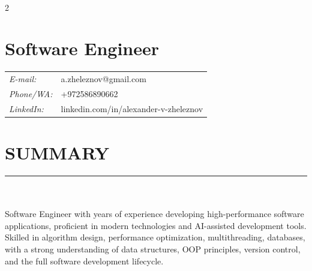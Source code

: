 \documentclass[a4paper,oneside,12pt]{article}
\providecommand{\jobposition}{Software Engineer}
\newcommand{\cvpart}[1]{%
\vspace{-1em}%
\section*{\large\bfseries\MakeTextUppercase{#1}}%
\vspace{-1em}%
\rule{\linewidth}{0.3em}\\[-.3em]%
}
\begin{document}
\begin{flushleft}
\vspace{-12em}{\Huge\bfseries Alexander Zheleznov }

~\\[-.5em]
\begin{multicols}{2}

\section*{\Large\bfseries \jobposition}%
\columnbreak
\begin{tabularx}{\linewidth}{ll}
{\it E-mail:}		        & a.zheleznov@gmail.com\\
{\it Phone/WA:}	    & {\small +972586890662} \\
{\it LinkedIn:}		& linkedin.com/in/alexander-v-zheleznov\\
\end{tabularx}
\end{multicols}
\end{flushleft}

\cvpart{Summary}
~\\
Software Engineer with years of experience developing high-performance software applications, proficient in modern technologies and AI-assisted development tools. Skilled in algorithm design, performance optimization, multithreading, databases, with a strong understanding of data structures, OOP principles, version control, and the full software development lifecycle.
\end{document}
